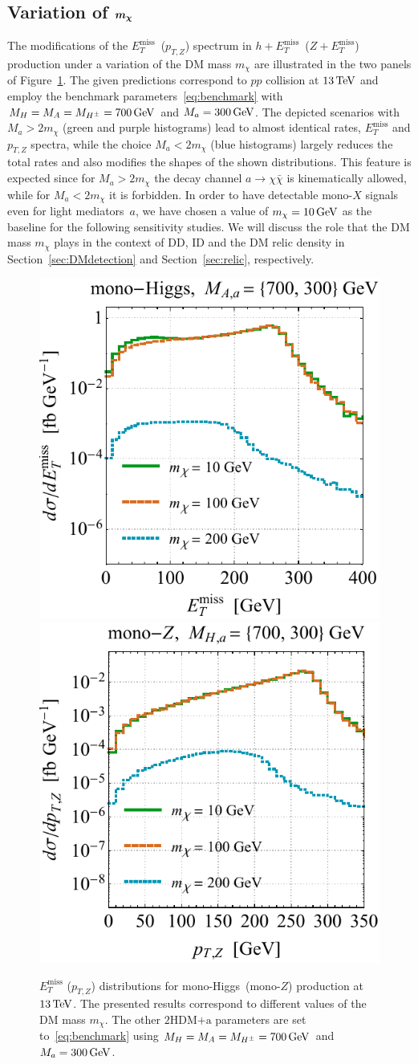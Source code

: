 \documentclass[a4paper, 11pt,notoc]{article}
\newcommand{\MET}{\ensuremath{E_T^\mathrm{miss}}\xspace}
\newcommand{\mA}{\ensuremath{M_{A}}\xspace}
\newcommand{\ma}{\ensuremath{M_{a}}\xspace}
\newcommand{\mH}{\ensuremath{M_{H}}\xspace}
\newcommand{\mHc}{\ensuremath{M_{H^{\pm}}}\xspace}
\newcommand{\hdma}{\ensuremath{\textrm{2HDM+a}}\xspace}
\def\bm#1{\mbox{\boldmath$#1$\unboldmath}}
\begin{document}
\subsection{Variation of $\bm{m_\chi}$}

The modifications of the $\MET$~($p_{T,Z}$) spectrum in $h+\MET$~($Z+\MET$) production under a variation of the DM mass $m_\chi$ are illustrated in the two panels of Figure~\ref{fig:mdmvar}. The given predictions correspond to $pp$ collision at $13 \, {\rm TeV}$ and employ the benchmark parameters~\eqref{eq:benchmark} with $\mH = \mA = \mHc = 700 \, {\rm GeV}$ and $\ma = 300 \, {\rm GeV}$. The depicted scenarios with $\ma  > 2 m_\chi$ (green and purple histograms) lead to almost identical rates, $\MET$ and $p_{T,Z}$ spectra, while the choice $\ma  < 2 m_\chi$ (blue histograms) 
largely reduces the total rates and also modifies the shapes of the shown distributions. This feature is expected since for $\ma > 2 m_\chi$ the decay channel $a \to \chi \bar \chi$ is kinematically allowed, while for $\ma < 2 m_\chi$ it is forbidden. In order to have detectable mono-$X$ signals even for light mediators~$a$, we have chosen a value of  $m_\chi = 10 \, {\rm GeV}$ as the baseline for the following sensitivity studies.  We will discuss the role that the DM mass $m_\chi$ plays in the context of DD, ID and the DM relic density in Section~\ref{sec:DMdetection}  and Section~\ref{sec:relic}, respectively. 

\begin{figure}[t!]
\centering
\includegraphics[height=0.45\textwidth]{mdml.pdf} \qquad 
\includegraphics[height=0.45\textwidth]{mdmr.pdf}
\vspace{2mm}
\caption{\label{fig:mdmvar} $\MET$ ($p_{T,Z}$) distributions for mono-Higgs~(mono-$Z$) production at $13 \, {\rm TeV}$. The presented results correspond to different values of the DM mass $m_\chi$. The other \hdma parameters are set to~\eqref{eq:benchmark} using $\mH = \mA = \mHc = 700 \, {\rm GeV}$ and $\ma = 300 \, {\rm GeV}$. }
\end{figure}
\end{document}
